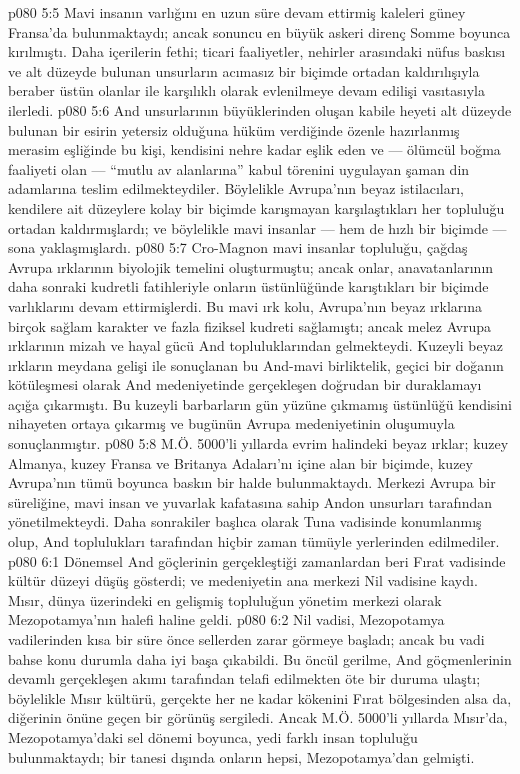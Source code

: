 \vs p080 5:5 Mavi insanın varlığını en uzun süre devam ettirmiş kaleleri güney Fransa’da bulunmaktaydı; ancak sonuncu en büyük askeri direnç Somme boyunca kırılmıştı. Daha içerilerin fethi; ticari faaliyetler, nehirler arasındaki nüfus baskısı ve alt düzeyde bulunan unsurların acımasız bir biçimde ortadan kaldırılışıyla beraber üstün olanlar ile karşılıklı olarak evlenilmeye devam edilişi vasıtasıyla ilerledi.
\vs p080 5:6 And unsurlarının büyüklerinden oluşan kabile heyeti alt düzeyde bulunan bir esirin yetersiz olduğuna hüküm verdiğinde özenle hazırlanmış merasim eşliğinde bu kişi, kendisini nehre kadar eşlik eden ve --- ölümcül boğma faaliyeti olan --- “mutlu av alanlarına” kabul törenini uygulayan şaman din adamlarına teslim edilmekteydiler. Böylelikle Avrupa’nın beyaz istilacıları, kendilere ait düzeylere kolay bir biçimde karışmayan karşılaştıkları her topluluğu ortadan kaldırmışlardı; ve böylelikle mavi insanlar --- hem de hızlı bir biçimde --- sona yaklaşmışlardı.
\vs p080 5:7 Cro\hyp{}Magnon mavi insanlar topluluğu, çağdaş Avrupa ırklarının biyolojik temelini oluşturmuştu; ancak onlar, anavatanlarının daha sonraki kudretli fatihleriyle onların üstünlüğünde karıştıkları bir biçimde varlıklarını devam ettirmişlerdi. Bu mavi ırk kolu, Avrupa’nın beyaz ırklarına birçok sağlam karakter ve fazla fiziksel kudreti sağlamıştı; ancak melez Avrupa ırklarının mizah ve hayal gücü And topluluklarından gelmekteydi. Kuzeyli beyaz ırkların meydana gelişi ile sonuçlanan bu And\hyp{}mavi birliktelik, geçici bir doğanın kötüleşmesi olarak And medeniyetinde gerçekleşen doğrudan bir duraklamayı açığa çıkarmıştı. Bu kuzeyli barbarların gün yüzüne çıkmamış üstünlüğü kendisini nihayeten ortaya çıkarmış ve bugünün Avrupa medeniyetinin oluşumuyla sonuçlanmıştır.
\vs p080 5:8 M.Ö. 5000’li yıllarda evrim halindeki beyaz ırklar; kuzey Almanya, kuzey Fransa ve Britanya Adaları’nı içine alan bir biçimde, kuzey Avrupa’nın tümü boyunca baskın bir halde bulunmaktaydı. Merkezi Avrupa bir süreliğine, mavi insan ve yuvarlak kafatasına sahip Andon unsurları tarafından yönetilmekteydi. Daha sonrakiler başlıca olarak Tuna vadisinde konumlanmış olup, And toplulukları tarafından hiçbir zaman tümüyle yerlerinden edilmediler.
\vs p080 6:1 Dönemsel And göçlerinin gerçekleştiği zamanlardan beri Fırat vadisinde kültür düzeyi düşüş gösterdi; ve medeniyetin ana merkezi Nil vadisine kaydı. Mısır, dünya üzerindeki en gelişmiş topluluğun yönetim merkezi olarak Mezopotamya’nın halefi haline geldi.
\vs p080 6:2 Nil vadisi, Mezopotamya vadilerinden kısa bir süre önce sellerden zarar görmeye başladı; ancak bu vadi bahse konu durumla daha iyi başa çıkabildi. Bu öncül gerilme, And göçmenlerinin devamlı gerçekleşen akımı tarafından telafi edilmekten öte bir duruma ulaştı; böylelikle Mısır kültürü, gerçekte her ne kadar kökenini Fırat bölgesinden alsa da, diğerinin önüne geçen bir görünüş sergiledi. Ancak M.Ö. 5000’li yıllarda Mısır’da, Mezopotamya’daki sel dönemi boyunca, yedi farklı insan topluluğu bulunmaktaydı; bir tanesi dışında onların hepsi, Mezopotamya’dan gelmişti.

